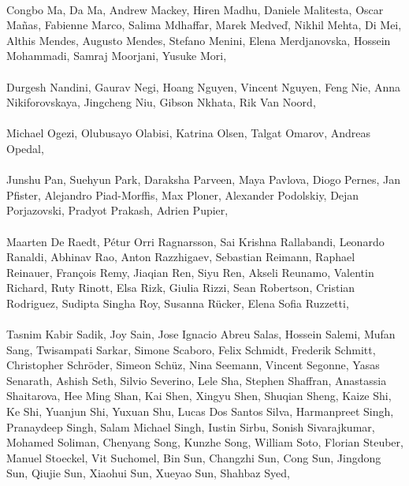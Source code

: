 \paragraph{}Congbo Ma, Da Ma, Andrew Mackey, Hiren Madhu, Daniele Malitesta, Oscar Mañas, Fabienne Marco, Salima Mdhaffar, Marek Medveď, Nikhil Mehta, Di Mei, Althis Mendes, Augusto Mendes, Stefano Menini, Elena Merdjanovska, Hossein Mohammadi, Samraj Moorjani, Yusuke Mori,
\paragraph{}Durgesh Nandini, Gaurav Negi, Hoang Nguyen, Vincent Nguyen, Feng Nie, Anna Nikiforovskaya, Jingcheng Niu, Gibson Nkhata, Rik Van Noord,
\paragraph{}Michael Ogezi, Olubusayo Olabisi, Katrina Olsen, Talgat Omarov, Andreas Opedal,
\paragraph{}Junshu Pan, Suehyun Park, Daraksha Parveen, Maya Pavlova, Diogo Pernes, Jan Pfister, Alejandro Piad-Morffis, Max Ploner, Alexander Podolskiy, Dejan Porjazovski, Pradyot Prakash, Adrien Pupier,
\paragraph{}Maarten De Raedt, Pétur Orri Ragnarsson, Sai Krishna Rallabandi, Leonardo Ranaldi, Abhinav Rao, Anton Razzhigaev, Sebastian Reimann, Raphael Reinauer, François Remy, Jiaqian Ren, Siyu Ren, Akseli Reunamo, Valentin Richard, Ruty Rinott, Elsa Rizk, Giulia Rizzi, Sean Robertson, Cristian Rodriguez, Sudipta Singha Roy, Susanna Rücker, Elena Sofia Ruzzetti,
\paragraph{}Tasnim Kabir Sadik, Joy Sain, Jose Ignacio Abreu Salas, Hossein Salemi, Mufan Sang, Twisampati Sarkar, Simone Scaboro, Felix Schmidt, Frederik Schmitt, Christopher Schröder, Simeon Schüz, Nina Seemann, Vincent Segonne, Yasas Senarath, Ashish Seth, Silvio Severino, Lele Sha, Stephen Shaffran, Anastassia Shaitarova, Hee Ming Shan, Kai Shen, Xingyu Shen, Shuqian Sheng, Kaize Shi, Ke Shi, Yuanjun Shi, Yuxuan Shu, Lucas Dos Santos Silva, Harmanpreet Singh, Pranaydeep Singh, Salam Michael Singh, Iustin Sirbu, Sonish Sivarajkumar, Mohamed Soliman, Chenyang Song, Kunzhe Song, William Soto, Florian Steuber, Manuel Stoeckel, Vit Suchomel, Bin Sun, Changzhi Sun, Cong Sun, Jingdong Sun, Qiujie Sun, Xiaohui Sun, Xueyao Sun, Shahbaz Syed,
